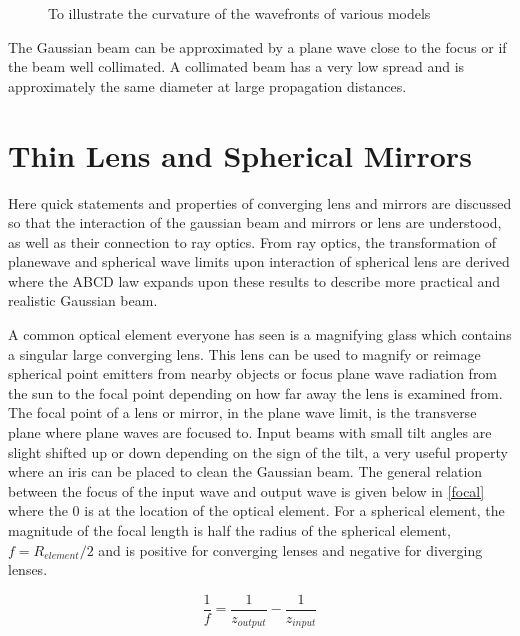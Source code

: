 \documentclass[11pt,a4paper]{book}
\newcommand{\imginput}[1]{} %
\begin{document}
			\begin{figure} [!ht]
				\centering
				\def\svgwidth{\columnwidth}
				\resizebox{16cm}{!}{\imginput{images/wavefront.pdf_tex}}
				\caption{To illustrate the curvature of the wavefronts of various models} 
				\label{fig:wavefront}
			\end{figure}	
			
			The Gaussian beam can be approximated by a plane wave close to the focus or if the beam well collimated. 
			A collimated beam has a very low spread and is approximately the same diameter at large propagation distances. 	
			
	\section{Thin Lens and Spherical Mirrors}
		\label{sec:Thin Lens and Spherical Mirrors}
		Here quick statements and properties of converging lens and mirrors are discussed so that the interaction of the gaussian beam and mirrors or lens are understood, as well as their connection to ray optics. From ray optics, the transformation of planewave and spherical wave limits upon interaction of spherical lens are derived where the ABCD law expands upon these results to describe more practical and realistic Gaussian beam.
		
		A common optical element everyone has seen is a magnifying glass which contains a singular large converging lens. 
		This lens can be used to magnify or reimage spherical point emitters from nearby objects or focus plane wave radiation from the sun to the focal point depending on how far away the lens is examined from.
		The focal point of a lens or mirror, in the plane wave limit, is the transverse plane where plane waves are focused to. 
		Input beams with small tilt angles are slight shifted up or down depending on the sign of the tilt, a very useful property where an iris can be placed to clean the Gaussian beam. 
		The general relation between the focus of the input wave and output wave is given below in \autoref{focal} where the 0 is at the location of the optical element. 
		For a spherical element, the magnitude of the focal length is half the radius of the spherical element, $f=R_{element}/2$ and is positive for converging lenses and negative for diverging lenses.
		
		\begin{equation}\label{focal}
			\frac{1}{f}=\frac{1}{z_{output}}-\frac{1}{z_{input}}
		\end{equation}
		
\end{document}
